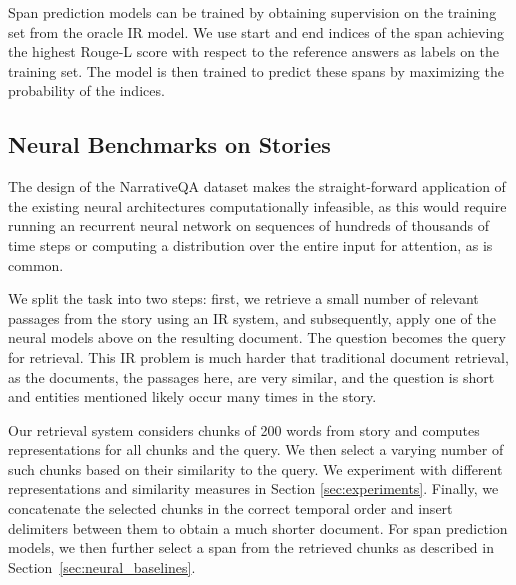 \documentclass[11pt,letterpaper]{article}
\begin{document}
Span prediction models can be trained by obtaining supervision on the training set from the oracle IR model. We use start and end indices of the span achieving the highest Rouge-L score with respect to the reference answers as labels on the training set. The model is then trained to predict these spans by maximizing the probability of the indices.


\subsection{Neural Benchmarks on Stories}


The design of the NarrativeQA dataset makes the straight-forward application of the existing neural architectures computationally infeasible, as this would require running an recurrent neural network on sequences of hundreds of thousands of time steps or computing a distribution over the entire input for attention, as is common.

We split the task into two steps: first, we retrieve a small number of relevant passages from the story using an IR system, and subsequently, apply one of the neural models above on the resulting document. The question becomes the query for retrieval.
This IR problem is much harder that traditional document retrieval, as the documents, the passages here, are very similar, and the question is short and entities mentioned likely occur many times in the story.

Our retrieval system considers chunks of 200 words from story and computes representations for all chunks and the query. We then select a varying number of such chunks based on their similarity to the query. We experiment with different representations and similarity measures in Section \ref{sec:experiments}. Finally, we concatenate the selected chunks in the correct temporal order and insert delimiters between them to obtain a much shorter document. For span prediction models, we then further select a span from the retrieved chunks as described in Section~\ref{sec:neural_baselines}.
\end{document}
